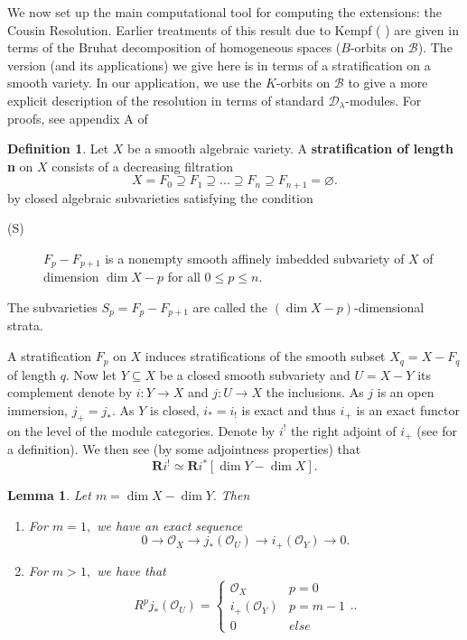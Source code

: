 \documentclass[letterpaper,twosided,11pt]{article}
\theoremstyle{plain}
\newtheorem{lemma}[theorem]{Lemma}
\theoremstyle{definition}
\newtheorem{definition}{Definition}
\theoremstyle{remark}
\begin{document}
We now set up the main computational tool for computing the extensions:
the Cousin Resolution.  Earlier treatments of this result due to Kempf (
\cite{Kempf1978}) are given in terms of the Bruhat decomposition of
homogeneous spaces ($ B $-orbits on $ \mathcal{B} $).  The version (and
its applications) we give here is in terms of a stratification on a
smooth variety.  In our application, we use the $ K $-orbits on $
\mathcal{B} $ to give a more explicit description of the resolution in
terms of standard $ \mathcal{D}_\lambda $-modules.  For proofs, see
appendix A of
\cite{MilicicRomanov2025}

\begin{definition}
    Let $ X $ be a smooth algebraic variety.  A \textbf{stratification
    of length n} on $ X $ consists of a decreasing filtration
    \[
        X=F_0\supseteq F_1\supseteq ...  \supseteq F_n\supseteq F_{n+1}=\varnothing.
    \]
    by closed algebraic subvarieties satisfying the condition
    \begin{description}
        \item[(S)]
            $ F_p-F_{p+1} $ is a nonempty smooth affinely imbedded
            subvariety of $ X $ of dimension $ \dim X-p $ for all $ 0\leq
            p\leq n. $
    \end{description}
    The subvarieties $ S_p=F_p-F_{p+1} $ are called the $ (\dim X-p) $-dimensional
    strata.
\end{definition}

A stratification $ F_p $ on $ X $ induces stratifications of the smooth
subset $ X_q=X-F_q $ of length $ q. $ Now let $ Y\subseteq X $ be a
closed smooth subvariety and $ U=X-Y $ its complement denote by $ i:Y\to
X $ and $ j:U\to X $ the inclusions.  As $ j $ is an open immersion, $ j_+=j_*.
$ As $ Y $ is closed, $ i_*=i_! $ is exact and thus $ i_+ $ is an exact
functor on the level of the module categories.  Denote by $ i^! $ the
right adjoint of $ i_+ $ (see
\cite[IV.8]{MilicicDModules} for a definition).  We then see (by some
adjointness properties) that
\[
    \textbf{R}i^!\simeq \textbf{R}i^*[\dim Y-\dim X].
\]

\begin{lemma}
    Let $ m=\dim X-\dim Y. $ Then
    \begin{enumerate}
        \item
            For $ m=1, $ we have an exact sequence
            \[
                0\to \mathcal{O}_X\to j_*(\mathcal{O}_U)\to i_+(\mathcal
                {O}_Y)\to0.
            \]
        \item
            For $ m>1, $ we have that
            \[
                R^pj_*(\mathcal{O}_U)=
                \begin{cases}
                    \mathcal{O}_X & p=0\\
                    i_+(\mathcal{O}_Y) & p=m-1 \\
                    0 & else
                \end{cases}.
                .
            \]
    \end{enumerate}
\end{lemma}
\end{document}
